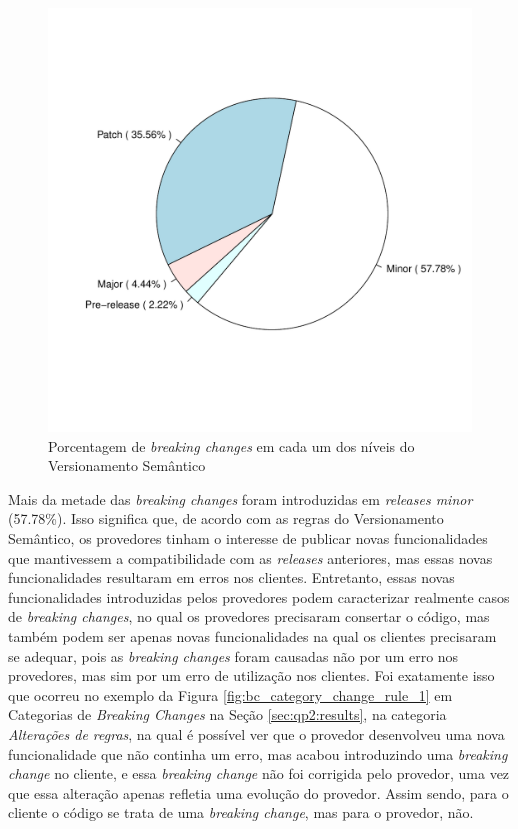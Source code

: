 \begin{figure}
    \centering
    \includegraphics[scale=0.65]{figuras/semver_levels.pdf}
    \caption{Porcentagem de \textit{breaking changes} em cada um dos níveis do Versionamento Semântico}
    \label{fig:semver_levels}
\end{figure}{}

Mais da metade das \textit{breaking changes} foram introduzidas em \textit{releases minor} (57.78\%). Isso significa que, de acordo com as regras do Versionamento Semântico, os provedores tinham o interesse de publicar novas funcionalidades que mantivessem a compatibilidade com as \textit{releases} anteriores, mas essas novas funcionalidades resultaram em erros nos clientes. Entretanto, essas novas funcionalidades introduzidas pelos provedores podem caracterizar realmente casos de \textit{breaking changes}, no qual os provedores precisaram consertar o código, mas também podem ser apenas novas funcionalidades na qual os clientes precisaram se adequar, pois as \textit{breaking changes} foram causadas não por um erro nos provedores, mas sim por um erro de utilização nos clientes.
Foi exatamente isso que ocorreu no exemplo da Figura \ref{fig:bc_category_change_rule_1} em Categorias de \textit{Breaking Changes} na Seção \ref{sec:qp2:results}, na categoria \textit{Alterações de regras}, na qual é possível ver que o provedor desenvolveu uma nova funcionalidade que não continha um erro, mas acabou introduzindo uma \textit{breaking change} no cliente, e essa \textit{breaking change} não foi corrigida pelo provedor, uma vez que essa alteração apenas refletia uma evolução do provedor. Assim sendo, para o cliente o código se trata de uma \textit{breaking change}, mas para o provedor, não.

